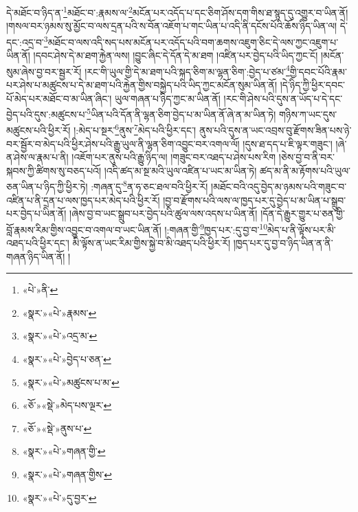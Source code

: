 དེ་མཐོང་བ་ཉིད་ན་\footnote{«པེ་»ནི་}མཐོང་བ་:རྣམས་ལ་\footnote{«སྣར་»«པེ་»རྣམས་}མངོན་པར་འདོད་པ་དང་ཅིག་ཤོས་དག་གིས་ཐ་སྙད་དུ་འགྱུར་བ་ཡིན་ནོ། །གསལ་བར་ཉམས་སུ་མྱོང་བ་ལས་དྲན་པའི་ས་བོན་འཇོག་པ་གང་ཡིན་པ་འདི་ནི་དངོས་པོའི་ཆོས་ཉིད་ཡིན་ལ། དེ་དང་:འདྲ་བ་\footnote{«སྣར་»«པེ་»འདྲ་མ་}མཐོང་བ་ལས་འདི་སད་པས་མངོན་པར་འདོད་པའི་བག་ཆགས་འཇུག་ཅིང་དེ་ལས་ཀྱང་འཇུག་པ་ཡིན་ནོ། །དབང་ཤེས་དེ་མ་ཐག་རྐྱེན་ལས། །བྱུང་ཞིང་དེ་དོན་དེ་མ་ཐག །འཛིན་པར་བྱེད་པའི་ཡིད་ཀྱང་ངོ། །མངོན་སུམ་ཞེས་བྱ་བར་སྦྱར་རོ། །རང་གི་ཡུལ་གྱི་དེ་མ་ཐག་པའི་སྐད་ཅིག་མ་ལྷན་ཅིག་:བྱེད་པ་ཙམ་\footnote{«སྣར་»«པེ་»བྱེད་པ་ཅན་}གྱི་དབང་པོའི་རྣམ་པར་ཤེས་པ་མཚུངས་པ་དེ་མ་ཐག་པའི་རྐྱེན་གྱིས་བསྐྱེད་པའི་ཡིད་ཀྱང་མངོན་སུམ་ཡིན་ནོ། །དེ་ཉིད་ཀྱི་ཕྱིར་དབང་པོ་མེད་པར་མཐོང་བ་མ་ཡིན་ཞིང་། ཡུལ་གཞན་པ་ཉིད་ཀྱང་མ་ཡིན་ནོ། །རང་གི་ཤེས་པའི་དུས་ན་ཡོད་པ་དེ་དང་བྱེད་པའི་དུས་:མཚུངས་པ་\footnote{«སྣར་»«པེ་»མཚུངས་པ་མ་}ཡིན་པའི་དོན་ནི་ལྷན་ཅིག་བྱེད་པ་མ་ཡིན་ནོ་ཞེ་ན་མ་ཡིན་ཏེ། གཉིས་ཀ་ཡང་དུས་མཚུངས་པའི་ཕྱིར་རོ། །:མེད་པ་སྔར་\footnote{«ཅོ་»«སྡེ་»མེད་པས་ལྔར་}ནུས་\footnote{«ཅོ་»«སྡེ་»ནུས་པ་}མེད་པའི་ཕྱིར་དང་། ནུས་པའི་དུས་ན་ཡང་འབྲས་བུ་རྫོགས་ཟིན་པས་ཉེ་བར་སྦྱོར་བ་མེད་པའི་ཕྱིར་ཤེས་པའི་རྒྱུ་ཡུལ་ནི་ལྷན་ཅིག་འབྱུང་བར་འགལ་ལོ། །དུས་ཐ་དད་པ་ཇི་ལྟར་གཟུང་། །ཞེ་ན་ཤེས་ལ་རྣམ་པ་ནི། །འཇོག་པར་ནུས་པའི་རྒྱུ་ཉིད་ལ། །གཟུང་བར་འཐད་པ་ཤེས་པས་རིག །ཅེས་བྱ་བ་ནི་བར་སྐབས་ཀྱི་ཚིགས་སུ་བཅད་པའོ། །འདི་ཚད་མ་སྔ་མའི་ཡུལ་འཛིན་པ་ཡང་མ་ཡིན་ཏེ། ཚད་མ་ནི་མ་རྟོགས་པའི་ཡུལ་ཅན་ཡིན་པ་ཉིད་ཀྱི་ཕྱིར་ཏེ། :གཞན་དུ་\footnote{«སྣར་»«པེ་»གཞན་གྱི་}ན་ཧ་ཅང་ཐལ་བའི་ཕྱིར་རོ། །མཐོང་བའི་འདུ་བྱེད་མ་ཉམས་པའི་གཟུང་བ་འཛིན་པ་ནི་དྲན་པ་ལས་ཁྱད་པར་མེད་པའི་ཕྱིར་རོ། །བྱ་བ་རྫོགས་པའི་ལས་ལ་ཁྱད་པར་དུ་བྱེད་པ་མ་ཡིན་པ་སྒྲུབ་པར་བྱེད་པ་ཡིན་ནོ། །ཞེས་བྱ་བ་ཡང་སྒྲུབ་པར་བྱེད་པའི་ཚུལ་ལས་འདས་པ་ཡིན་ནོ། །དོན་དེ་རྒྱུར་གྱུར་པ་ཅན་གྱི་བློ་རྣམས་རིམ་གྱིས་འབྱུང་བ་འགལ་བ་ཡང་ཡིན་ནོ། །:གཞན་གྱི་\footnote{«སྣར་»«པེ་»གཞན་གྱིས་}ཁྱད་པར་:དུ་བྱ་བ་\footnote{«སྣར་»«པེ་»དུ་བྱར་}མེད་པ་ནི་ལྟོས་པར་མི་འཐད་པའི་ཕྱིར་དང་། མི་ལྟོས་ན་ཡང་རིམ་གྱིས་སྐྱེ་བ་མི་འཐད་པའི་ཕྱིར་རོ། །ཁྱད་པར་དུ་བྱ་བ་ཉིད་ཡིན་ན་ནི་གཞན་ཉིད་ཡིན་ནོ། །
